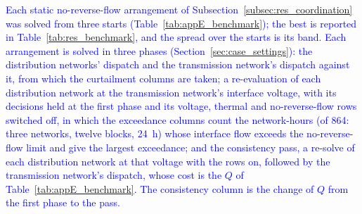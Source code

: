 \documentclass[preprint,12pt]{elsarticle}
\begin{document}
\textcolor{blue}{
    Each static no-reverse-flow arrangement of Subsection~\ref{subsec:res_coordination} was solved from three starts (Table~\ref{tab:appE_benchmark}); the best is reported in Table~\ref{tab:res_benchmark}, and the spread over the starts is its band. Each arrangement is solved in three phases (Section~\ref{sec:case_settings}): the distribution networks' dispatch and the transmission network's dispatch against it, from which the curtailment columns are taken; a re-evaluation of each distribution network at the transmission network's interface voltage, with its decisions held at the first phase and its voltage, thermal and no-reverse-flow rows switched off, in which the exceedance columns count the network-hours (of 864: three networks, twelve blocks, 24~h) whose interface flow exceeds the no-reverse-flow limit and give the largest exceedance; and the consistency pass, a re-solve of each distribution network at that voltage with the rows on, followed by the transmission network's dispatch, whose cost is the $Q$ of Table~\ref{tab:appE_benchmark}. The consistency column is the change of $Q$ from the first phase to the pass.
}
\end{document}
